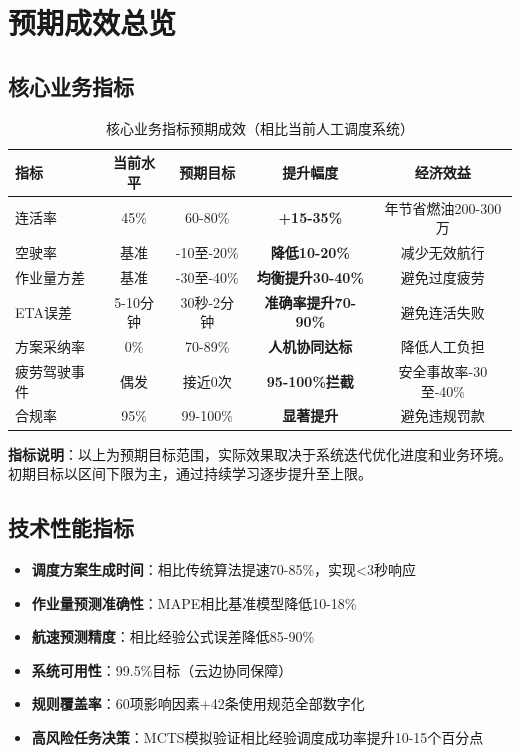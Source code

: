\documentclass[12pt,a4paper]{article}
\begin{document}
\section{预期成效总览}

\subsection{核心业务指标}

\begin{table}[h]
\centering
\begin{tabular}{lcccc}
\toprule
\textbf{指标} & \textbf{当前水平} & \textbf{预期目标} & \textbf{提升幅度} & \textbf{经济效益} \\
\midrule
\rowcolor{yellow!20}
连活率 & 45\% & 60-80\% & \textbf{+15-35\%} & 年节省燃油200-300万 \\
空驶率 & 基准 & -10至-20\% & \textbf{降低10-20\%} & 减少无效航行 \\
作业量方差 & 基准 & -30至-40\% & \textbf{均衡提升30-40\%} & 避免过度疲劳 \\
ETA误差 & 5-10分钟 & 30秒-2分钟 & \textbf{准确率提升70-90\%} & 避免连活失败 \\
方案采纳率 & 0\% & 70-89\% & \textbf{人机协同达标} & 降低人工负担 \\
\rowcolor{green!20}
疲劳驾驶事件 & 偶发 & 接近0次 & \textbf{95-100\%拦截} & 安全事故率-30至-40\% \\
\rowcolor{green!20}
合规率 & 95\% & 99-100\% & \textbf{显著提升} & 避免违规罚款 \\
\bottomrule
\end{tabular}
\caption{核心业务指标预期成效（相比当前人工调度系统）}
\end{table}

\textbf{指标说明}：以上为预期目标范围，实际效果取决于系统迭代优化进度和业务环境。初期目标以区间下限为主，通过持续学习逐步提升至上限。

\subsection{技术性能指标}

\begin{itemize}[leftmargin=*]
    \item[\checkmark] \textbf{调度方案生成时间}：相比传统算法提速70-85\%，实现<3秒响应
    \item[\checkmark] \textbf{作业量预测准确性}：MAPE相比基准模型降低10-18\%
    \item[\checkmark] \textbf{航速预测精度}：相比经验公式误差降低85-90\%
    \item[\checkmark] \textbf{系统可用性}：99.5\%目标（云边协同保障）
    \item[\checkmark] \textbf{规则覆盖率}：60项影响因素+42条使用规范全部数字化
    \item[\checkmark] \textbf{高风险任务决策}：MCTS模拟验证相比经验调度成功率提升10-15个百分点
\end{itemize}
\end{document}
